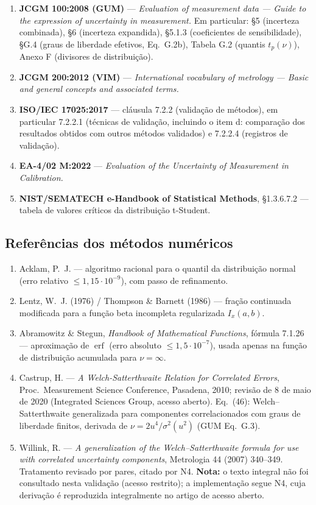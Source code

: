 \documentclass[11pt,a4paper]{article}
\begin{document}
\begin{enumerate}[label=R\arabic*., leftmargin=2.6em]
  \item \textbf{JCGM 100:2008 (GUM)} --- \emph{Evaluation of measurement data --- Guide to the expression of uncertainty in measurement.} Em particular: §5 (incerteza combinada), §6 (incerteza expandida), §5.1.3 (coeficientes de sensibilidade), §G.4 (graus de liberdade efetivos, Eq.~G.2b), Tabela G.2 (quantis \(t_p(\nu)\)), Anexo F (divisores de distribuição).
  \item \textbf{JCGM 200:2012 (VIM)} --- \emph{International vocabulary of metrology --- Basic and general concepts and associated terms.}
  \item \textbf{ISO/IEC 17025:2017} --- cláusula 7.2.2 (validação de métodos), em particular 7.2.2.1 (técnicas de validação, incluindo o item d: comparação dos resultados obtidos com outros métodos validados) e 7.2.2.4 (registros de validação).
  \item \textbf{EA-4/02 M:2022} --- \emph{Evaluation of the Uncertainty of Measurement in Calibration.}
  \item \textbf{NIST/SEMATECH e-Handbook of Statistical Methods}, §1.3.6.7.2 --- tabela de valores críticos da distribuição t-Student.
\end{enumerate}

\subsection{Referências dos métodos numéricos}

\begin{enumerate}[label=N\arabic*., leftmargin=2.6em]
  \item Acklam, P.~J. --- algoritmo racional para o quantil da distribuição normal (erro relativo \(\leq 1{,}15 \cdot 10^{-9}\)), com passo de refinamento.
  \item Lentz, W.~J. (1976) / Thompson \& Barnett (1986) --- fração continuada modificada para a função beta incompleta regularizada \(I_x(a,b)\).
  \item Abramowitz \& Stegun, \emph{Handbook of Mathematical Functions}, fórmula 7.1.26 --- aproximação de \(\operatorname{erf}\) (erro absoluto \(\leq 1{,}5 \cdot 10^{-7}\)), usada apenas na função de distribuição acumulada para \(\nu = \infty\).
  \item Castrup, H. --- \emph{A Welch-Satterthwaite Relation for Correlated Errors}, Proc.\ Measurement Science Conference, Pasadena, 2010; revisão de 8 de maio de 2020 (Integrated Sciences Group, acesso aberto). Eq.~(46): Welch--Satterthwaite generalizada para componentes correlacionados com graus de liberdade finitos, derivada de \(\nu = 2u^4/\sigma^2(u^2)\) (GUM Eq.~G.3).
  \item Willink, R. --- \emph{A generalization of the Welch--Satterthwaite formula for use with correlated uncertainty components}, Metrologia 44 (2007) 340--349. Tratamento revisado por pares, citado por N4. \textbf{Nota:} o texto integral não foi consultado nesta validação (acesso restrito); a implementação segue N4, cuja derivação é reproduzida integralmente no artigo de acesso aberto.
\end{enumerate}
\end{document}
